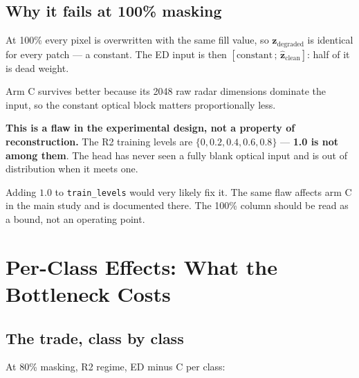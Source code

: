 \documentclass[11pt,a4paper]{report}
\newcommand{\code}[1]{\texttt{\small #1}}
\newcommand{\zd}{\mathbf{z}_{\text{degraded}}}
\newcommand{\zh}{\hat{\mathbf{z}}_{\text{clean}}}
\begin{document}
\section{Why it fails at 100\% masking}

At 100\% every pixel is overwritten with the same fill value, so $\zd$ is
identical for every patch --- a constant. The ED input is then
$[\text{constant} \,;\, \zh]$: half of it is dead weight.

Arm C survives better because its 2048 raw radar dimensions dominate the input,
so the constant optical block matters proportionally less.

\begin{flagbox}
\textbf{This is a flaw in the experimental design, not a property of
reconstruction.} The R2 training levels are
$\{0, 0.2, 0.4, 0.6, 0.8\}$ --- \textbf{1.0 is not among them}. The head has
never seen a fully blank optical input and is out of distribution when it meets
one.

\medskip
Adding $1.0$ to \code{train\_levels} would very likely fix it. The same flaw
affects arm C in the main study and is documented there. The 100\% column should
be read as a bound, not an operating point.
\end{flagbox}

\chapter{Per-Class Effects: What the Bottleneck Costs}
\label{ch:perclass}

\section{The trade, class by class}

At 80\% masking, R2 regime, ED minus C per class:
\end{document}
